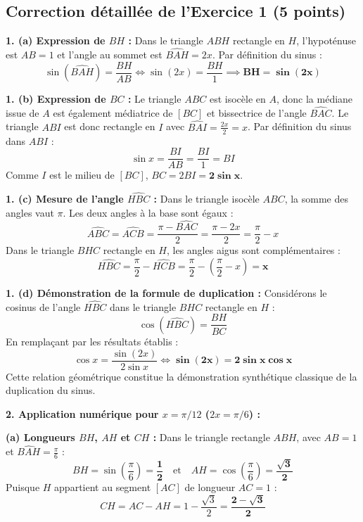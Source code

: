 \documentclass[11pt,a4paper]{article}
\begin{document}
\vspace{0.3cm}

\subsection*{Correction détaillée de l'Exercice 1 \hfill (5 points)}

\begin{correctionbox}
\textbf{1. (a) Expression de $BH$ :}
Dans le triangle $ABH$ rectangle en $H$, l'hypoténuse est $AB = 1$ et l'angle au sommet est $\widehat{BAH} = 2x$.
Par définition du sinus :
\[
\sin(\widehat{BAH}) = \frac{BH}{AB} \iff \sin(2x) = \frac{BH}{1} \implies \mathbf{BH = \sin(2x)}
\]

\textbf{1. (b) Expression de $BC$ :}
Le triangle $ABC$ est isocèle en $A$, donc la médiane issue de $A$ est également médiatrice de $[BC]$ et bissectrice de l'angle $\widehat{BAC}$.
Le triangle $ABI$ est donc rectangle en $I$ avec $\widehat{BAI} = \frac{2x}{2} = x$.
Par définition du sinus dans $ABI$ :
\[
\sin x = \frac{BI}{AB} = \frac{BI}{1} = BI
\]
Comme $I$ est le milieu de $[BC]$, $BC = 2 BI = \mathbf{2\sin x}$.

\textbf{1. (c) Mesure de l'angle $\widehat{HBC}$ :}
Dans le triangle isocèle $ABC$, la somme des angles vaut $\pi$. Les deux angles à la base sont égaux :
\[
\widehat{ABC} = \widehat{ACB} = \frac{\pi - \widehat{BAC}}{2} = \frac{\pi - 2x}{2} = \frac{\pi}{2} - x
\]
Dans le triangle $BHC$ rectangle en $H$, les angles aigus sont complémentaires :
\[
\widehat{HBC} = \frac{\pi}{2} - \widehat{HCB} = \frac{\pi}{2} - \left(\frac{\pi}{2} - x\right) = \mathbf{x}
\]

\textbf{1. (d) Démonstration de la formule de duplication :}
Considérons le cosinus de l'angle $\widehat{HBC}$ dans le triangle $BHC$ rectangle en $H$ :
\[
\cos(\widehat{HBC}) = \frac{BH}{BC}
\]
En remplaçant par les résultats établis :
\[
\cos x = \frac{\sin(2x)}{2\sin x} \iff \mathbf{\sin(2x) = 2\sin x \cos x}
\]
Cette relation géométrique constitue la démonstration synthétique classique de la duplication du sinus.

\vspace{0.2cm}
\textbf{2. Application numérique pour $x = \pi/12$ ($2x = \pi/6$) :}

\textbf{(a) Longueurs $BH$, $AH$ et $CH$ :}
Dans le triangle rectangle $ABH$, avec $AB = 1$ et $\widehat{BAH} = \frac{\pi}{6}$ :
\[
BH = \sin\left(\frac{\pi}{6}\right) = \mathbf{\frac{1}{2}} \quad \text{et} \quad AH = \cos\left(\frac{\pi}{6}\right) = \mathbf{\frac{\sqrt{3}}{2}}
\]
Puisque $H$ appartient au segment $[AC]$ de longueur $AC = 1$ :
\[
CH = AC - AH = 1 - \frac{\sqrt{3}}{2} = \mathbf{\frac{2 - \sqrt{3}}{2}}
\]


\end{correctionbox}
\end{document}
